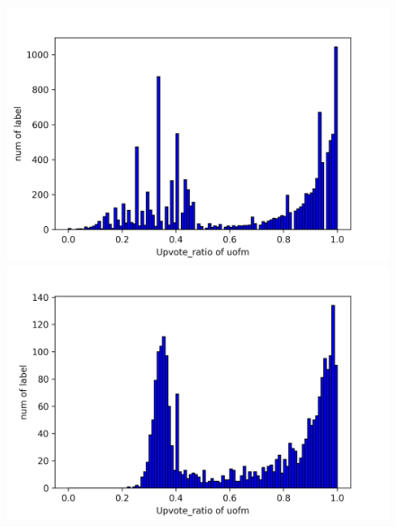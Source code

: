 \documentclass[11pt,a4paper]{article}
\begin{document}
    \begin{figure}
        \begin{minipage}{0.5\textwidth}
            \includegraphics[width=\textwidth]{uofm_task2true_nonsmooth.png}
        \end{minipage}
        \begin{minipage}{0.5\textwidth}
            \includegraphics[width=\textwidth]{uofm_task2pred_nonsmooth.png}
        \end{minipage}


\end{figure}
\end{document}

